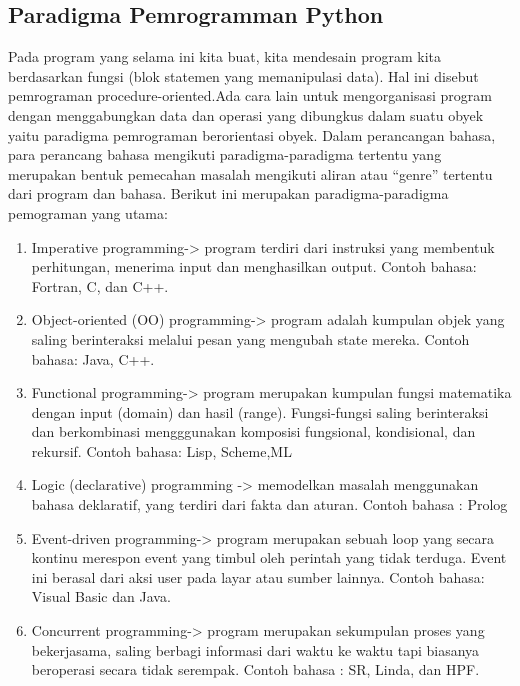 \subsection{Paradigma Pemrogramman Python}
Pada program yang selama ini kita buat, kita mendesain program kita berdasarkan fungsi (blok statemen yang memanipulasi data). Hal ini disebut pemrograman procedure-oriented.Ada cara lain untuk mengorganisasi program dengan menggabungkan data dan operasi yang dibungkus dalam suatu obyek yaitu paradigma pemrograman berorientasi obyek.
Dalam perancangan bahasa, para perancang bahasa mengikuti paradigma-paradigma tertentu yang merupakan bentuk pemecahan masalah mengikuti aliran atau “genre” tertentu dari program dan bahasa. Berikut ini merupakan paradigma-paradigma pemograman yang utama:
\begin{enumerate}
\item Imperative programming-> program terdiri dari instruksi yang membentuk perhitungan, menerima input dan menghasilkan output. Contoh bahasa: Fortran, C, dan C++.
\item Object-oriented (OO) programming-> program adalah kumpulan objek yang saling berinteraksi melalui pesan yang mengubah state mereka. Contoh bahasa: Java, C++.
\item Functional programming-> program merupakan kumpulan fungsi matematika dengan input (domain) dan hasil (range). Fungsi-fungsi saling berinteraksi dan berkombinasi mengggunakan komposisi fungsional, kondisional, dan rekursif. Contoh bahasa: Lisp, Scheme,ML
\item Logic (declarative) programming -> memodelkan masalah menggunakan bahasa deklaratif, yang terdiri dari fakta dan aturan. Contoh bahasa : Prolog
\item Event-driven programming-> program merupakan sebuah loop yang secara kontinu  merespon event yang timbul oleh perintah yang tidak terduga.  Event ini berasal dari aksi user pada layar atau sumber lainnya. Contoh bahasa: Visual Basic dan Java.
\item Concurrent programming-> program merupakan sekumpulan proses yang bekerjasama, saling berbagi informasi dari waktu ke waktu tapi biasanya beroperasi secara tidak serempak. Contoh bahasa : SR, Linda, dan HPF.
\end{enumerate}

